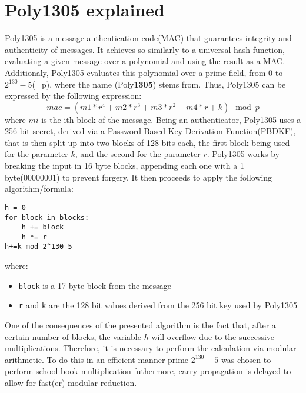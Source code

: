 \documentclass[twocolumn]{article}
\begin{document}
\section{Poly1305 explained}
Poly1305 is a message authentication code(MAC) that guarantees integrity and authenticity of messages. It achieves so similarly to a universal hash function, evaluating 
a given message over a polynomial and using the result as a MAC. Additionaly, Poly1305 evaluates this polynomial over a prime field, from 0 to $2^{130}-5$(=p), where the 
name (Poly\textbf{1305}) stems from. Thus, Poly1305 can be expressed by the following expression: $$mac = (m1 * r^4 + m2 * r^3 + m3 * r^2 + m4 * r + k) \mod{p} $$ where $mi$
is the ith block of the message. Being an authenticator, Poly1305 uses a 256 bit secret, derived via a Password-Based Key Derivation Function(PBDKF), that is then split up 
into two blocks of 128 bits each, the first block being used for the parameter $k$, and the second for the parameter $r$. Poly1305 works by breaking the input in 16 byte 
blocks, appending each one with a 1 byte(00000001) to prevent forgery. It then proceeds to apply the following algorithm/formula:

\begin{verbatim}
h = 0
for block in blocks:
    h += block
    h *= r
h+=k mod 2^130-5
\end{verbatim}

where:
\begin{itemize}
    \item \texttt{block} is a 17 byte block from the message 
    \item \texttt{r} and \texttt{k} are the 128 bit values derived from the 256 bit key used by Poly1305
\end{itemize}

One of the consequences of the presented algorithm is the fact that, after a certain number of blocks, the variable $h$ will overflow due to the successive multiplications.
Therefore, it is necessary to perform the calculation via modular arithmetic. To do this in an efficient manner prime $2^{130}-5$ was chosen to perform school book 
multiplication futhermore, carry propagation is delayed to allow for fast(er) modular reduction.
\end{document}
